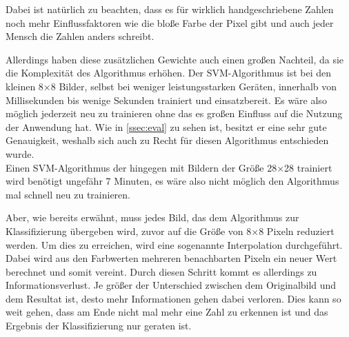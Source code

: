Dabei ist natürlich zu beachten, dass es für wirklich handgeschriebene Zahlen noch mehr Einflussfaktoren wie die bloße Farbe der Pixel gibt und auch jeder Mensch die Zahlen anders schreibt.\par

Allerdings haben diese zusätzlichen Gewichte auch einen großen Nachteil, da sie die Komplexität des Algorithmus erhöhen. Der SVM-Algorithmus ist bei den kleinen 8×8 Bilder, selbst bei weniger leistungsstarken Geräten, innerhalb von Millisekunden bis wenige Sekunden trainiert und einsatzbereit. Es wäre also möglich jederzeit neu zu trainieren ohne das es großen Einfluss auf die Nutzung der Anwendung hat. Wie in \ref{ssec:eval} zu sehen ist, besitzt er eine sehr gute Genauigkeit, weshalb sich auch zu Recht für diesen Algorithmus entschieden wurde. \hfill \\
Einen SVM-Algorithmus der hingegen mit Bildern der Größe 28×28 trainiert wird benötigt ungefähr 7 Minuten, es wäre also nicht möglich den Algorithmus mal schnell neu zu trainieren.\par

Aber, wie bereits erwähnt, muss jedes Bild, das dem Algorithmus zur Klassifizierung übergeben wird, zuvor auf die Größe von 8×8 Pixeln reduziert werden. Um dies zu erreichen, wird eine sogenannte Interpolation durchgeführt. Dabei wird aus den Farbwerten mehreren benachbarten Pixeln ein neuer Wert berechnet und somit vereint. Durch diesen Schritt kommt es allerdings zu Informationsverlust. Je größer der Unterschied zwischen dem Originalbild und dem Resultat ist, desto mehr Informationen gehen dabei verloren. Dies kann so weit gehen, dass am Ende nicht mal mehr eine Zahl zu erkennen ist und das Ergebnis der Klassifizierung nur geraten ist.\par

